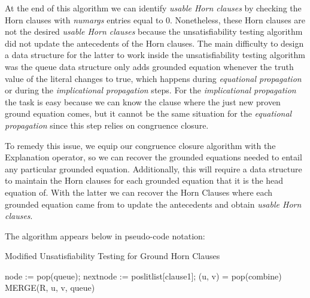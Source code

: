 At the end of this algorithm we can identify 
\emph{usable Horn clauses} by checking the Horn clauses
with \emph{numargs} entries equal to 0. Nonetheless, these 
Horn clauses are not the
desired \emph{usable Horn clauses} because the 
unsatisfiability testing algorithm
did not update the antecedents of the Horn clauses. 
The main difficulty to design a data structure
for the latter to work inside the unsatisfiability 
testing algorithm was the queue data structure
only adds grounded equation whenever the truth 
value of the literal changes to true, which happens
during \emph{equational propagation} or during 
the \emph{implicational propagation} steps.
For the \emph{implicational propagation} the task is 
easy because we can know the clause
where the just new proven ground equation comes, 
but it cannot be the same situation
for the \emph{equational propagation} since this 
step relies on congruence closure.

To remedy this issue, we equip our congruence closure 
algorithm with the Explanation operator, so
we can recover the grounded equations needed to entail 
any particular grounded equation. Additionally,
this will require a data structure to maintain the Horn 
clauses for each grounded equation that
it is the head equation of. With the latter we can 
recover the Horn Clauses where each grounded
equation came from to update the antecedents and 
obtain \emph{usable Horn clauses}.

The algorithm appears below in pseudo-code notation:

\begin{algorithm}
  \caption{Modified Unsatisfiability Testing for Ground Horn Clauses}
  \linespread{\separationline}\selectfont
  \begin{algorithmic}[1]
    \State node := pop(queue);
    \EndIf
    \State nextnode := poslitlist[clause1];
    \EndIf
    \Else
    \EndIf
    \EndIf
    \EndIf
    \EndFor
    \EndIf
    \EndWhile
    \EndProcedure
    \Statex
    \State (u, v) = pop(combine)
    \State MERGE(R, u, v, queue)
    \EndWhile
    \EndProcedure
  \end{algorithmic}
\end{algorithm}


